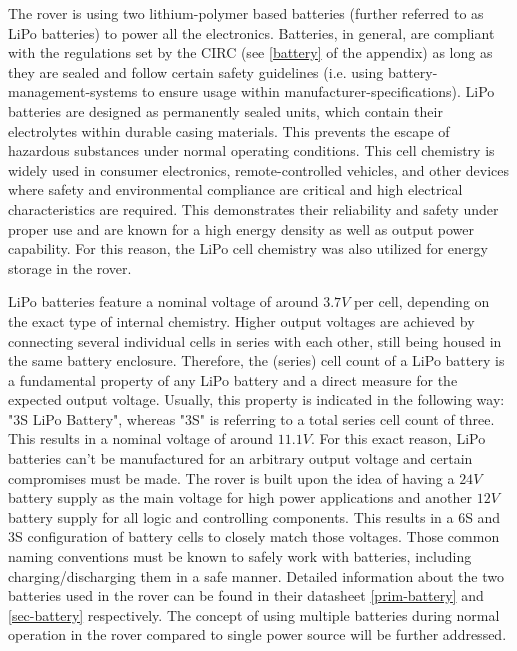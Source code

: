     The rover is using two lithium-polymer based batteries (further referred to as LiPo batteries) to power all the electronics. Batteries, in general, are compliant with the regulations set by the CIRC (see \ref{battery} of the appendix) as long as they are sealed and follow certain safety guidelines (i.e. using battery-management-systems to ensure usage within manufacturer-specifications). LiPo batteries are designed as permanently sealed units, which contain their electrolytes within durable casing materials. This prevents the escape of hazardous substances under normal operating conditions. This cell chemistry is widely used in consumer electronics, remote-controlled vehicles, and other devices where safety and environmental compliance are critical and high electrical characteristics are required. This demonstrates their reliability and safety under proper use and are known for a high energy density as well as output power capability. For this reason, the LiPo cell chemistry was also utilized for energy storage in the rover.
    
    \vspace{5mm} %
    
    LiPo batteries feature a nominal voltage of around $3.7V$ per cell, depending on the exact type of internal chemistry. Higher output voltages are achieved by connecting several individual cells in series with each other, still being housed in the same battery enclosure. Therefore, the (series) cell count of a LiPo battery is a fundamental property of any LiPo battery and a direct measure for the expected output voltage. Usually, this property is indicated in the following way: "3S LiPo Battery", whereas "3S" is referring to a total series cell count of three. This results in a nominal voltage of around $11.1V$. For this exact reason, LiPo batteries can't be manufactured for an arbitrary output voltage and certain compromises must be made. The rover is built upon the idea of having a $24V$ battery supply as the main voltage for high power applications and another $12V$ battery supply for all logic and controlling components. This results in a 6S and 3S configuration of battery cells to closely match those voltages. Those common naming conventions must be known to safely work with batteries, including charging/discharging them in a safe manner. Detailed information about the two batteries used in the rover can be found in their datasheet \ref{prim-battery} and \ref{sec-battery} respectively. The concept of using multiple batteries during normal operation in the rover compared to single power source will be further addressed.

